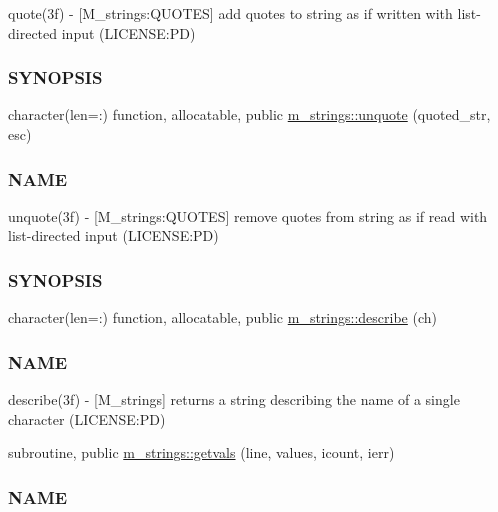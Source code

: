 \begin{DoxyCompactItemize}
\begin{DoxyCompactList}
quote(3f) -\/ \mbox{[}M\+\_\+strings\+:Q\+U\+O\+T\+ES\mbox{]} add quotes to string as if written with list-\/directed input (L\+I\+C\+E\+N\+SE\+:PD) \subsubsection*{S\+Y\+N\+O\+P\+S\+IS}\end{DoxyCompactList}\item 
character(len=\+:) function, allocatable, public \mbox{\hyperlink{namespacem__strings_acb88c65d5df2d5b3e55df2d2dab57390}{m\+\_\+strings\+::unquote}} (quoted\+\_\+str, esc)
\begin{DoxyCompactList}\small\item\em \subsubsection*{N\+A\+ME}

unquote(3f) -\/ \mbox{[}M\+\_\+strings\+:Q\+U\+O\+T\+ES\mbox{]} remove quotes from string as if read with list-\/directed input (L\+I\+C\+E\+N\+SE\+:PD) \subsubsection*{S\+Y\+N\+O\+P\+S\+IS}\end{DoxyCompactList}\item 
character(len=\+:) function, allocatable, public \mbox{\hyperlink{namespacem__strings_a8d7007f0c34d7db4c004dac56e609b3f}{m\+\_\+strings\+::describe}} (ch)
\begin{DoxyCompactList}\small\item\em \subsubsection*{N\+A\+ME}

describe(3f) -\/ \mbox{[}M\+\_\+strings\mbox{]} returns a string describing the name of a single character (L\+I\+C\+E\+N\+SE\+:PD) \end{DoxyCompactList}\item 
subroutine, public \mbox{\hyperlink{namespacem__strings_abf6c760f5d15a306bd252337d0a5ba4d}{m\+\_\+strings\+::getvals}} (line, values, icount, ierr)
\begin{DoxyCompactList}\small\item\em \subsubsection*{N\+A\+ME}


\end{DoxyCompactList}
\end{DoxyCompactItemize}
